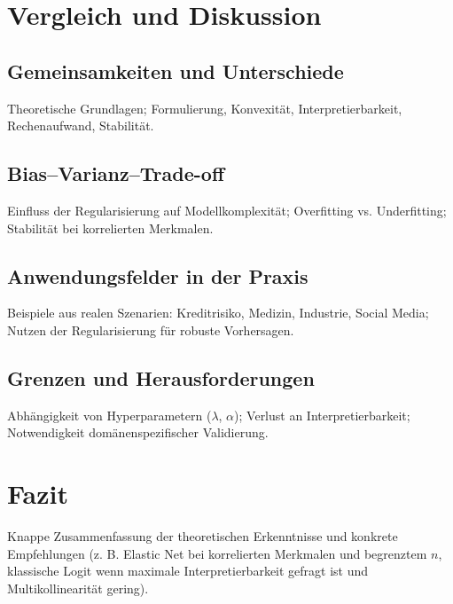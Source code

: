 \documentclass[12pt,a4paper]{article}
\begin{document}
\section{Vergleich und Diskussion}

\subsection{Gemeinsamkeiten und Unterschiede}
Theoretische Grundlagen; Formulierung, Konvexität, Interpretierbarkeit,
Rechenaufwand, Stabilität.

\subsection{Bias–Varianz–Trade-off}
Einfluss der Regularisierung auf Modellkomplexität; 
Overfitting vs. Underfitting; Stabilität bei korrelierten Merkmalen.

\subsection{Anwendungsfelder in der Praxis}
Beispiele aus realen Szenarien: Kreditrisiko, Medizin, Industrie, 
Social Media; Nutzen der Regularisierung für robuste Vorhersagen.

\subsection{Grenzen und Herausforderungen}
Abhängigkeit von Hyperparametern ($\lambda$, $\alpha$);
Verlust an Interpretierbarkeit; Notwendigkeit domänenspezifischer Validierung.


\section{Fazit}
Knappe Zusammenfassung der theoretischen Erkenntnisse und
konkrete Empfehlungen (z. B. Elastic Net bei korrelierten Merkmalen
und begrenztem $n$, klassische Logit wenn maximale Interpretierbarkeit
gefragt ist und Multikollinearität gering).


\end{document}
